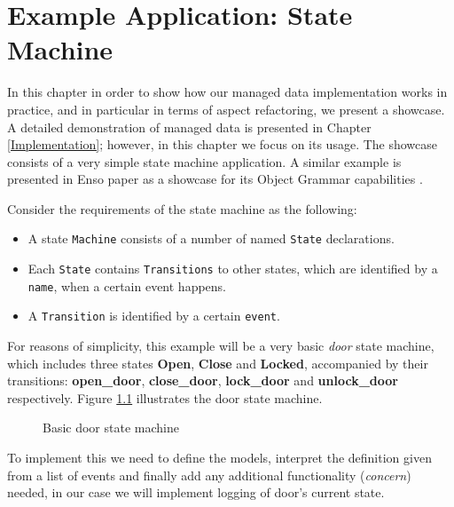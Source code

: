 
\chapter{Example Application: State Machine}\label{Example Application}
In this chapter in order to show how our managed data implementation works in practice, and in particular in terms of aspect refactoring, we present a showcase.
A detailed demonstration of managed data is presented in Chapter \ref{Implementation}; however, in this chapter we focus on its usage.
The showcase consists of a very simple state machine application.
A similar example is presented in Enso paper as a showcase for its Object Grammar capabilities \cite{storm2012object}.

Consider the requirements of the state machine as the following: 
\begin{itemize}
	\item A state \texttt{Machine} consists of a number of named \texttt{State} declarations.

	\item Each \texttt{State} contains \texttt{Transitions} to other states, which are identified by a \texttt{name}, when a certain event happens.

	\item A \texttt{Transition} is identified by a certain \texttt{event}.
\end{itemize}

For reasons of simplicity, this example will be a very basic \textit{door} state machine, which includes three states \textbf{Open}, \textbf{Close} and \textbf{Locked}, accompanied by their transitions: \textbf{open\_door}, \textbf{close\_door}, \textbf{lock\_door} and \textbf{unlock\_door} respectively.
Figure \ref{fig:State_machine} illustrates the door state machine.

\begin{figure}[H]
	\centering
  	\caption{Basic door state machine}
  	\label{fig:State_machine}
\end{figure}

To implement this we need to define the models, interpret the definition given from a list of events and finally add any additional functionality (\textit{concern}) needed, in our case we will implement logging of door's current state.

